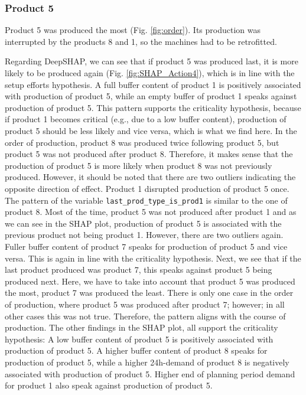 \subsubsection{Product 5}
Product 5 was produced the most (Fig. \ref{fig:order}). Its production was interrupted by the products 8 and 1, so the machines had to be retrofitted.

Regarding DeepSHAP, we can see that if product 5 was produced last, it is more likely to be produced again (Fig. \ref{fig:SHAP_Action4}), which is in line with the setup efforts hypothesis.
A full buffer content of product 1 is positively associated with production of product 5, while an empty buffer of product 1 speaks against production of product 5. This pattern supports the criticality hypothesis, because if product 1 becomes critical (e.g., due to a low buffer content), production of product 5 should be less likely and vice versa, which is what we find here.
In the order of production, product 8 was produced twice following product 5, but product 5 was not produced after product 8. Therefore, it makes sense that the production of product 5 is more likely when product 8 was not previously produced. However, it should be noted that there are two outliers indicating the opposite direction of effect.
Product 1 disrupted production of product 5 once. The pattern of the variable \texttt{last\_prod\_type\_is\_prod1} is similar to the one of product 8. Most of the time, product 5 was not produced after product 1 and as we can see in the SHAP plot, production of product 5 is associated with the previous product not being product 1. However, there are two outliers again.
Fuller buffer content of product 7 speaks for production of product 5 and vice versa. This is again in line with the criticality hypothesis.
Next, we see that if the last product produced was product 7, this speaks against product 5 being produced next. Here, we have to take into account that product 5 was produced the most, product 7 was produced the least. There is only one case in the order of production, where product 5 was produced after product 7; however; in all other cases this was not true. Therefore, the pattern aligns with the course of production.
The other findings in the SHAP plot, all support the criticality hypothesis:
A low buffer content of product 5 is positively associated with production of product 5.
A higher buffer content of product 8 speaks for production of product 5, while a higher 24h-demand of product 8 is negatively associated with production of product 5.
Higher end of planning period demand for product 1 also speak against production of product 5.

